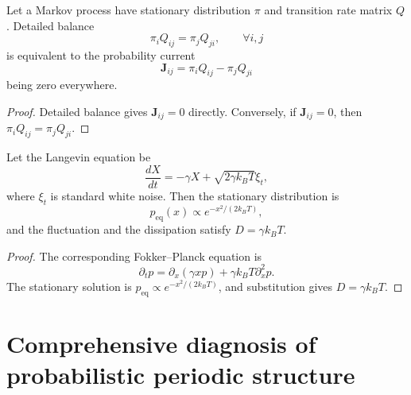 \begin{proposition}\label{prop:detailed_balance_curl}
Let a Markov process have stationary distribution $\pi$ and transition rate matrix $Q$. Detailed balance
\[
\pi_iQ_{ij}=\pi_jQ_{ji},\qquad \forall i,j
\]
is equivalent to the probability current
\[
\mathbf J_{ij}=\pi_iQ_{ij}-\pi_jQ_{ji}
\]
being zero everywhere.
\end{proposition}

\begin{proof}
Detailed balance gives $\mathbf J_{ij}=0$ directly. Conversely, if $\mathbf J_{ij}=0$, then $\pi_iQ_{ij}=\pi_jQ_{ji}$.
\end{proof}

\begin{theorem}\label{thm:fluctuation_dissipation_grammar}
Let the Langevin equation be
\[
\frac{dX}{dt}=-\gamma X+\sqrt{2\gamma k_BT}\xi_t,
\]
where $\xi_t$ is standard white noise. Then the stationary distribution is
\[
p_{\mathrm{eq}}(x)\propto e^{-x^2/(2k_BT)},
\]
and the fluctuation and the dissipation satisfy $D=\gamma k_BT$.
\end{theorem}

\begin{proof}
The corresponding Fokker--Planck equation is
\[
\partial_tp=\partial_x(\gamma xp)+\gamma k_BT\partial_x^2p.
\]
The stationary solution is $p_{\mathrm{eq}}\propto e^{-x^2/(2k_BT)}$, and substitution gives $D=\gamma k_BT$.
\end{proof}

\section{Comprehensive diagnosis of probabilistic periodic structure}
\label{sec:prob_final_diagnosis}

